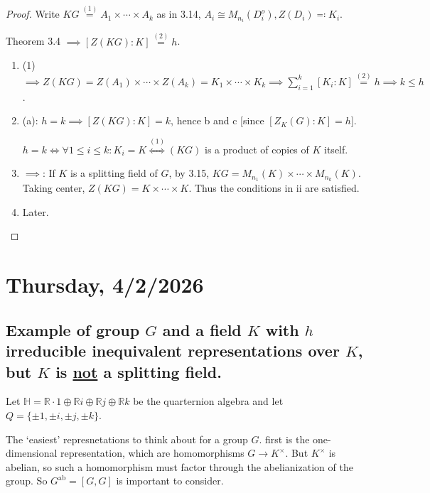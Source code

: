 \documentclass{article}
\theoremstyle{definition}
\theoremstyle{plain}
\theoremstyle{remark}
\begin{document}
    \begin{proof}
        Write \(KG \overset{(1)}{=} A_1 \times \cdots \times A_k\) as in 3.14, \(A_i \cong M_{n_i}(D_i^o), Z(D_i) \eqqcolon K_i\).

        Theorem 3.4 \(\implies [Z(KG):K] \overset{(2)}{=} h\).

        \begin{enumerate}[label=\roman*)]
            \item (1) \(\implies Z(KG) = Z(A_1) \times \cdots \times Z(A_k) = K_1 \times \cdots \times K_k \implies \sum_{i=1}^k [K_i : K] \overset{(2)}{=} h \implies k \leq h\).
            \item (a): \(h = k \implies [Z(KG):K] = k\), hence b and c [since \([Z_K(G) : K] = h\)].
            
            \(h=k \iff \forall 1 \leq i \leq k : K_i = K \overset{(1)}{\iff} (KG)\) is a product of copies of \(K\) itself.

            \item \(\implies\): If \(K\) is a splitting field of \(G\), by 3.15, \(KG = M_{n_1}(K) \times \cdots \times M_{n_k}(K)\). Taking center, \(Z(KG) = K \times \cdots \times K\). Thus the conditions in ii are satisfied.
            
            \item Later.
            
        \end{enumerate} 
    \end{proof}

    \section*{Thursday, 4/2/2026}
    
    \subsection*{Example of group \(G\) and a field \(K\) with \(h\) irreducible inequivalent representations over \(K\), but \(K\) is \underline{not} a splitting field.}

    Let \(\mathbb{H} = \mathbb{R} \cdot 1 \oplus \mathbb{R} i \oplus \mathbb{R} j \oplus \mathbb{R} k\) be the quarternion algebra and let \(Q = \{ \pm 1, \pm i, \pm j, \pm k \}\).

    The `easiest' represnetations to think about for a group \(G\). first is the one-dimensional representation, which are homomorphisms \(G \to K^\times\). But \(K^\times\) is abelian, so such a homomorphism must factor through the abelianization of the group. So \(G^{\text{ab}} = [G,G]\) is important to consider.
\end{document}
